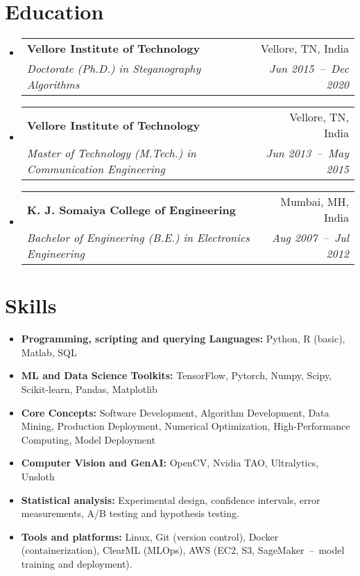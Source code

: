 \documentclass[a4paper,11pt]{article}
\makeatletter
\newcommand{\resumeSubheading}[4]{
  \vspace{-1pt}\item
    \begin{tabular*}{0.97\textwidth}[t]{l@{\extracolsep{\fill}}r}
      \textbf{#1} & #2 \\
      \textit{\small#3} & \textit{\small #4} \\
    \end{tabular*}\vspace{-5pt}
}
\newcommand{\resumeSubHeadingListStart}{\begin{itemize}[leftmargin=*]}
\newcommand{\resumeSubHeadingListEnd}{\end{itemize}}
\makeatother
\begin{document}
\section{Education}
  \resumeSubHeadingListStart
    \resumeSubheading
      {Vellore Institute of Technology}{Vellore, TN, India}
      {Doctorate (Ph.D.) in Steganography Algorithms}{Jun 2015~--~Dec 2020}
    \resumeSubheading
      {Vellore Institute of Technology}{Vellore, TN, India}
      {Master of Technology (M.Tech.) in Communication Engineering}{Jun 2013~--~May 2015}
    \resumeSubheading
      {K. J. Somaiya College of Engineering}{Mumbai, MH, India}
      {Bachelor of Engineering (B.E.) in Electronics Engineering}{Aug 2007~--~Jul 2012}
  \resumeSubHeadingListEnd

\section{Skills}
	\begin{itemize}[leftmargin=*, itemsep = -2pt]
    \item{\textbf{Programming, scripting and querying Languages:} Python, R (basic), Matlab, SQL}
		\item{\textbf{ML and Data Science Toolkits:} TensorFlow, Pytorch, Numpy, Scipy, Scikit-learn, Pandas, Matplotlib}
		\item {\textbf{Core Concepts: }Software Development, Algorithm Development, Data Mining, Production Deployment, Numerical Optimization, High-Performance Computing, Model Deployment}
		\item{\textbf{Computer Vision and GenAI:} OpenCV, Nvidia TAO, Ultralytics, Unsloth}
		\item{\textbf{Statistical analysis:} Experimental design, confidence intervals, error measurements, A/B testing and hypothesis testing.}
    \item{\textbf{Tools and platforms:} Linux, Git (version control), Docker (containerization), ClearML (MLOps), AWS (EC2, S3, SageMaker~--~model training and deployment).}
    
	\end{itemize}

\end{document}

